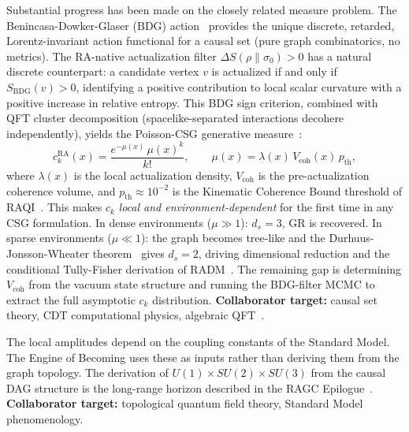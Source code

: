 \documentclass[11pt,a4paper]{article}
\theoremstyle{plain}
\theoremstyle{definition}
\theoremstyle{remark}
\begin{document}
\begin{description}
  Substantial progress has been made on the closely related measure problem.
  The Benincasa-Dowker-Glaser (BDG) action~\citep{Benincasa2010} provides the
  unique discrete, retarded, Lorentz-invariant action functional for a causal
  set (pure graph combinatorics, no metrics). The RA-native actualization filter
  $\Delta S(\rho\|\sigma_0) > 0$ has a natural discrete counterpart: a candidate
  vertex $v$ is actualized if and only if $S_{\mathrm{BDG}}(v) > 0$, identifying
  a positive contribution to local scalar curvature with a positive increase in
  relative entropy. This BDG sign criterion, combined with QFT cluster
  decomposition (spacelike-separated interactions decohere independently), yields
  the Poisson-CSG generative measure~\citep{Sandeman2026b}:
  \begin{equation}
    c_k^{\mathrm{RA}}(x) = \frac{e^{-\mu(x)}\,\mu(x)^k}{k!},
    \qquad
    \mu(x) = \lambda(x)\,V_{\mathrm{coh}}(x)\,p_{\mathrm{th}},
  \end{equation}
  where $\lambda(x)$ is the local actualization density, $V_{\mathrm{coh}}$ is
  the pre-actualization coherence volume, and $p_{\mathrm{th}} \approx 10^{-2}$
  is the Kinematic Coherence Bound threshold of RAQI~\citep{Sandeman2026d}.
  This makes $c_k$ \emph{local and environment-dependent} for the first time in
  any CSG formulation. In dense environments ($\mu \gg 1$): $d_s = 3$, GR is
  recovered. In sparse environments ($\mu \ll 1$): the graph becomes tree-like
  and the Durhuus-Jonsson-Wheater theorem~\citep{Durhuus2010} gives $d_s = 2$,
  driving dimensional reduction and the conditional Tully-Fisher derivation of
  RADM~\citep{Sandeman2026RADM}. The remaining gap is determining $V_{\mathrm{coh}}$
  from the vacuum state structure and running the BDG-filter MCMC to extract
  the full asymptotic $c_k$ distribution.
  \textbf{Collaborator target:} causal set theory, CDT computational physics,
  algebraic QFT~\citep{Dowker2005,RideoutSorkin2000}.

  \item[Hard Wall 3: The Standard Model Couplings.]
  The local amplitudes depend on the coupling constants of the Standard Model.
  The Engine of Becoming uses these as inputs rather than deriving them from
  the graph topology. The derivation of $U(1) \times SU(2) \times SU(3)$ from
  the causal DAG structure is the long-range horizon described in the RAGC
  Epilogue~\citep{Sandeman2026b}.
  \textbf{Collaborator target:} topological quantum field theory, Standard
  Model phenomenology.
\end{description}
\end{document}

